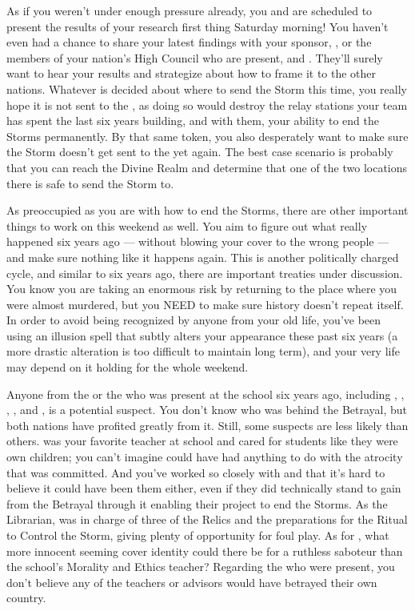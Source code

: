 \documentclass[char]{GL2020}
\begin{document}
As if you weren't under enough pressure already, you and \cHeadScientist{} are scheduled to present the results of your research first thing Saturday morning! You haven't even had a chance to share your latest findings with your sponsor, \cDiplomat{}, or the members of your nation's High Council who are present, \cAntiChup{\intro} and \cTechStar{}. They’ll surely want to hear your results and strategize about how to frame it to the other nations. Whatever is decided about where to send the Storm this time, you really hope it is not sent to the \pTech{}, as doing so would destroy the relay stations your team has spent the last six years building, and with them, your ability to end the Storms permanently. By that same token, you also desperately want to make sure the Storm doesn’t get sent to the \pShip{} yet again. The best case scenario is probably that you can reach the Divine Realm and determine that one of the two locations there is safe to send the Storm to.

As preoccupied as you are with how to end the Storms, there are other important things to work on this weekend as well. You aim to figure out what really happened six years ago — without blowing your cover to the wrong people — and make sure nothing like it happens again. This is another politically charged cycle, and similar to six years ago, there are important treaties under discussion. You know you are taking an enormous risk by returning to the place where you were almost murdered, but you NEED to make sure history doesn't repeat itself. In order to avoid being recognized by anyone from your old life, you've been using an illusion spell that subtly alters your appearance these past six years (a more drastic alteration is too difficult to maintain long term), and your very life may depend on it holding for the whole weekend.

Anyone from the \pTech{} or the \pFarm{} who was present at the school six years ago, including \cDiplomat{\full}, \cHeadScientist{\full}, \cMusic{\intro}, \cEthics{\intro}, and \cLibrarian{\intro}, is a potential suspect. You don't know who was behind the Betrayal, but both nations have profited greatly from it. Still, some suspects are less likely than others. \cMusic{} was your favorite teacher at school and \cMusic{\they} cared for \cMusic{\their} students like they were \cMusic{\their} own children; you can't imagine \cMusic{\they} could have had anything to do with the atrocity that was committed. And you've worked so closely with \cHeadScientist{} and \cDiplomat{} that it's hard to believe it could have been them either, even if they did technically stand to gain from the Betrayal through it enabling their project to end the Storms. As the Librarian, \cLibrarian{} was in charge of three of the Relics and the preparations for the Ritual to Control the Storm, giving \cLibrarian{\them} plenty of opportunity for foul play. As for \cEthics{}, what more innocent seeming cover identity could there be for a ruthless saboteur than the school’s Morality and Ethics teacher? Regarding the \pShippies{} who were present, you don't believe any of the teachers or advisors would have betrayed their own country. 
\end{document}
